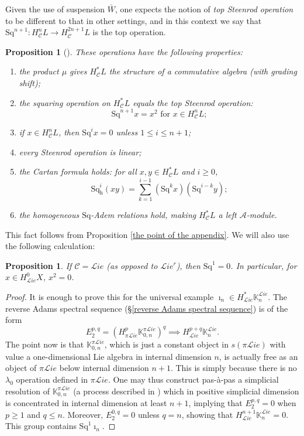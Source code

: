 \documentclass[11pt]{amsart} \renewcommand{\baselinestretch}{1.2}
\theoremstyle{plain}
\newtheorem{prop}[thm]{Proposition}
\numberwithin{equation}{section} %
\theoremstyle{plain}
\newtheorem{prop}[thm]{Proposition}
\numberwithin{equation}{chapter} %
\renewcommand{\to}{\longrightarrow}
\newcommand{\scrL}{\mathscr{L}}
\newcommand{\calA}{\mathcal{A}}
\newcommand{\calc}{\mathcal{C}}
\newcommand{\citeBOX}[2][]{\cite[\mbox{#1}]{#2}}
\newcommand{\PA}[1]{\pi#1}
\newcommand{\Sq}{\mathrm{Sq}}
\newcommand{\LieSteen}{\calA}
\newcommand{\liealgs}{{\scrL\!\textit{ie}}}
\newcommand{\restliealgs}{{\scrL\!\textit{ie}^\textit{r}}}
\newcommand{\dhor}{_\mathrm{h}}
\newcommand{\Sqh}{\mathrm{Sq}\dhor}
\begin{document}
\begin{Constructing cohomology operations}
Given the use of suspension $\bar{W}$, one expects the notion of \emph{top Steenrod operation} to be different to that in other settings, and in this context we say that $\Sq^{n+1}:H^n_\calc L\to H^{2n+1}_\calc L$ is the top operation.
\begin{prop}[{\citeBOX[\S5.3]{PriddySimplicialLie.pdf}}]
\label{omnibus on coh of simp lie algs}These operations have the following properties:
\begin{enumerate}
\item the product $\mu$ gives $H^*_{\calc}L$ the structure of a commutative algebra (with grading shift);
\item the squaring operation on $H^*_{\calc}L$ equals the \emph{top Steenrod operation}:
\[\Sq^{n+1}x=x^{2}\text{\ \ for $x\in H^n_{\calc}L$};\]
\item \label{Sq unstable vanishing} if $x\in H^n_{\calc}L$, then $\Sq^ix=0$ unless $1\leq i\leq n+1$;
\item every Steenrod operation is linear;
\item the \emph{Cartan formula} holds:  for all $x,y\in   H^*_{\calc}L$ and $i\geq0$,
\[\Sqh^i(xy)=\textstyle\sum_{k=1}^{i-1}(\Sq^kx)(\Sq^{i-k}y);\]
\item \label{yeah H is a Stmodule} the  homogeneous $\Sq$-Adem relations hold, making $H^{*}_\calc L$ a left $\LieSteen$-module.
\end{enumerate}
\end{prop}
This fact follows from Proposition \ref{the point of the appendix}. We will also use the following calculation:
\begin{prop}
\label{prop on sq1 on lie not rest}
If $\calc=\liealgs$ (as opposed to $\restliealgs$), then $\Sq^1=0$. In particular, for $x\in H^0_{\liealgs}X$, $x^2=0$.
\end{prop}
\begin{proof}
It is enough to prove this for the universal example $\imath_n\in H^*_{\liealgs}\mathbb{K}_n^{\liealgs}$. The reverse Adams spectral sequence (\S\ref{reverse Adams spectral sequence}) is of the form
\[E_2^{p,q}=(H^{p}_{\PA{\liealgs}}\mathbb{K}_{0,n}^{\PA{\liealgs}})^{q}\implies H^{p+q}_{\liealgs}\mathbb{K}_n^{\liealgs}.\]
The point now is that $\mathbb{K}_{0,n}^{\PA{\liealgs}}$, which is just a constant object in $s(\PA{\liealgs})$ with value a one-dimensional Lie algebra in internal dimension $n$, is actually free as an object of $\PA{\liealgs}$ below internal dimension $n+1$. This is simply because there is no $\lambda_0$ operation defined in $\PA{\liealgs}$. One may thus construct pas-\`a-pas a simplicial resolution of $\mathbb{K}_{0,n}^{\PA{\liealgs}}$ (a process described in \cite{Andre-StepByStep}) which in positive simplicial dimension is concentrated in internal dimension at least $n+1$, implying that $E_2^{p,q}=0$ when $p\geq1$ and $q\leq n$. Moreover, $E_2^{0,q}=0$ unless $q=n$, showing that $H^{n+1}_{\liealgs}\mathbb{K}_n^{\liealgs}=0$. This group contains $\Sq^1\imath_n$.

\end{proof}
\end{Constructing cohomology operations}
\end{document}
